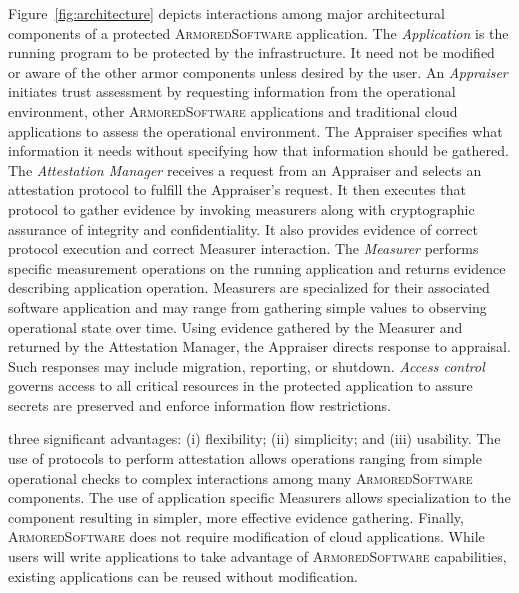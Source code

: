 \documentclass{tufte-handout}
\begin{document}
Figure~\ref{fig:architecture} depicts interactions among major
architectural components of a protected \textsc{ArmoredSoftware}
application.  The \emph{Application} is the running program to be
protected by the infrastructure.  It need not be modified or aware of
the other armor components unless desired by the user.  An
\emph{Appraiser} initiates trust assessment by requesting information
from the operational environment, other \textsc{ArmoredSoftware}
applications and traditional cloud applications to assess the
operational environment.  The Appraiser specifies what information it
needs without specifying how that information should be gathered.  The
\emph{Attestation Manager} receives a request from an Appraiser and
selects an attestation protocol to fulfill the Appraiser's request.
It then executes that protocol to gather evidence by invoking
measurers along with cryptographic assurance of integrity and
confidentiality.  It also provides evidence of correct protocol
execution and correct Measurer interaction.  The \emph{Measurer}
performs specific measurement operations on the running application
and returns evidence describing application operation. Measurers are
specialized for their associated software application and may range
from gathering simple values to observing operational state over time.
Using evidence gathered by the Measurer and returned by the
Attestation Manager, the Appraiser directs response to appraisal.
Such responses may include migration, reporting, or shutdown.
\emph{Access control} governs access to all critical resources in the
protected application to assure secrets are preserved and enforce
information flow restrictions.

 three
significant advantages: (i) flexibility; (ii) simplicity; and (iii)
usability.  The use of protocols to perform attestation allows
operations ranging from simple operational checks to complex
interactions among many \textsc{ArmoredSoftware} components.  The use
of application specific Measurers allows specialization to the
component resulting in simpler, more effective evidence gathering.
Finally, \textsc{ArmoredSoftware} does not require modification of
cloud applications.  While users will write applications to take
advantage of \textsc{ArmoredSoftware} capabilities, existing
applications can be reused without modification.
\end{document}
